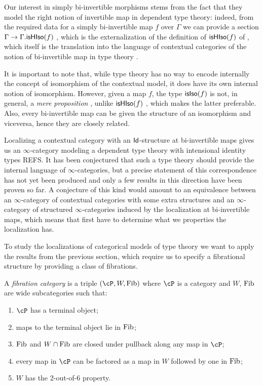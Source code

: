 \begin{rmk}
  Our interest in simply bi-invertible morphisms stems from the fact that they
  model the right notion of invertible map in dependent type theory: indeed,
  from the
  required data for a simply bi-invertible map $f$ over $\Gamma$ we can provide
  a section $\Gamma\rightarrow\Gamma.\mathsf{isHIso}({f})$ ,
  which is the externalization of the definition of $\mathsf{isHIso}({f})$ of
  \cite[Def.~B.3.3]{KL12}, which itself is the translation into the language of
  contextual categories of the notion of bi-invertible map in type theory
  \cite[Def~4.3.1]{Uni13}.

  It is important to note that, while type theory has no way to encode
  internally the concept of isomorphism of the contextual model, it does have
  its own internal notion of isomorphism. However, given a map $f$, the type
  $\mathsf{isIso}({f})$ is not, in general, a \emph{mere proposition}
  \cite[Def.~3.3.1]{Uni13}, unlike $\mathsf{isHIso}({f})$
  \cite[Thm.~4.3.2]{Uni13}, which makes the latter
  preferable. Also, every bi-invertible map can be given the structure of an
  isomorphism and viceversa, hence they are closely related.
\end{rmk}

\begin{rmk}
Localizing a contextual category with an $\operatorname{\mathsf{Id}}$-structure at bi-invertible maps
gives us an $\infty$-category modeling a dependent type theory with intensional
identity types REFS. It has been conjectured that such a type theory should
provide the internal language of $\infty$-categories, but a precise statement of
this correspondence has not yet been produced and only a few results in this
direction have
been proven so far. A conjecture of this kind would amount to an equivalence
between
an $\infty$-category of contextual categories with some extra structures and an
$\infty$-category of structured $\infty$-categories induced by the localization
at bi-invertible maps, which means that first have to determine what we
properties the localization has.
\end{rmk}

To study the localizations of categorical models of type theory we want to apply
the results from the previous section, which require us to specify a
fibrational structure by providing a class
of fibrations.

\begin{defn}
  A \emph{fibration category} is a triple $(\cP,W,\fib)$ where $\cP$ is a
  category and $W$, $\operatorname{Fib}$ are wide subcategories such that:
  \begin{enumerate}
    \item $\cP$ has a terminal object;
    \item maps to the terminal object lie in $\operatorname{Fib}$;
    \item $\operatorname{Fib}$ and $W\cap \operatorname{Fib}$ are closed under pullback along any map in $\cP$;
    \item every map in $\cP$ can be factored as a map in $W$ followed by one in
      $\operatorname{Fib}$;
    \item $W$ has the 2-out-of-6 property.
  \end{enumerate}
\end{defn}

